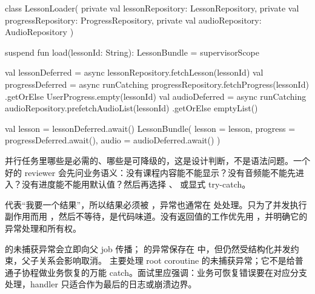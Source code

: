 \begin{ktfix}
class LessonLoader(
    private val lessonRepository: LessonRepository,
    private val progressRepository: ProgressRepository,
    private val audioRepository: AudioRepository
) {
    suspend fun load(lessonId: String): LessonBundle = supervisorScope {
        val lessonDeferred = async { lessonRepository.fetchLesson(lessonId) }
        val progressDeferred = async {
            runCatching { progressRepository.fetchProgress(lessonId) }
                .getOrElse { UserProgress.empty(lessonId) }
        }
        val audioDeferred = async {
            runCatching { audioRepository.prefetchAudioList(lessonId) }
                .getOrElse { emptyList() }
        }

        val lesson = lessonDeferred.await()
        LessonBundle(
            lesson = lesson,
            progress = progressDeferred.await(),
            audio = audioDeferred.await()
        )
    }
}
\end{ktfix}

\begin{idea}[失败域的划分]
并行任务里哪些是必需的、哪些是可降级的，这是设计判断，不是语法问题。一个好的 reviewer 会先问业务语义：没有课程内容能不能显示？没有音频能不能先进入？没有进度能不能用默认值？然后再选择 、 或显式 try-catch。
\end{idea}

\begin{pitfall}
 代表“我要一个结果”，所以结果必须被 ，异常也通常在  处处理。只为了并发执行副作用而用 ，然后不等待，是代码味道。没有返回值的工作优先用 ，并明确它的异常处理和所有权。
\end{pitfall}

\begin{followup}
 的未捕获异常会立即向父 job 传播； 的异常保存在  中，但仍然受结构化并发约束，父子关系会影响取消。 主要处理 root coroutine 的未捕获异常；它不是给普通子协程做业务恢复的万能 catch。面试里应强调：业务可恢复错误要在对应分支处理，handler 只适合作为最后的日志或崩溃边界。
\end{followup}


